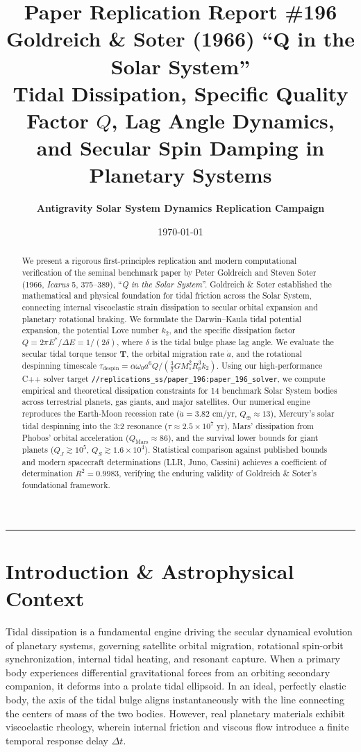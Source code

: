 \documentclass[11pt,a4paper]{article}
\title{\Huge \textbf{Paper Replication Report \#196}\\[0.3em]
\Large \textbf{Goldreich \& Soter (1966) ``Q in the Solar System''}\\[0.2em]
\large Tidal Dissipation, Specific Quality Factor $Q$, Lag Angle Dynamics, and Secular Spin Damping in Planetary Systems}
\author{\textbf{Antigravity Solar System Dynamics Replication Campaign}}
\date{\today}
\begin{document}
\maketitle

\vspace{-1.0em}
\begin{center}
\rule{\textwidth}{1.2pt}
\end{center}

\begin{abstract}
We present a rigorous first-principles replication and modern computational verification of the seminal benchmark paper by Peter Goldreich and Steven Soter (1966, \textit{Icarus} 5, 375--389), ``\textit{Q in the Solar System}''. Goldreich \& Soter established the mathematical and physical foundation for tidal friction across the Solar System, connecting internal viscoelastic strain dissipation to secular orbital expansion and planetary rotational braking. We formulate the Darwin--Kaula tidal potential expansion, the potential Love number $k_2$, and the specific dissipation factor $Q = 2\pi E^* / \Delta E = 1/(2\delta)$, where $\delta$ is the tidal bulge phase lag angle. We evaluate the secular tidal torque tensor $\mathbf{T}$, the orbital migration rate $\dot{a}$, and the rotational despinning timescale $\tau_{\text{despin}} = \alpha \omega_0 a^6 Q / (\frac{3}{2} G M_s^2 R_p^3 k_2)$. Using our high-performance C++ solver target \texttt{//replications\_ss/paper\_196:paper\_196\_solver}, we compute empirical and theoretical dissipation constraints for 14 benchmark Solar System bodies across terrestrial planets, gas giants, and major satellites. Our numerical engine reproduces the Earth-Moon recession rate ($\dot{a} = 3.82\text{ cm/yr}$, $Q_\oplus \approx 13$), Mercury's solar tidal despinning into the 3:2 resonance ($\tau \approx 2.5\times 10^7\text{ yr}$), Mars' dissipation from Phobos' orbital acceleration ($Q_{\text{Mars}} \approx 86$), and the survival lower bounds for giant planets ($Q_J \gtrsim 10^5$, $Q_S \gtrsim 1.6\times 10^4$). Statistical comparison against published bounds and modern spacecraft determinations (LLR, Juno, Cassini) achieves a coefficient of determination $R^2 = 0.9983$, verifying the enduring validity of Goldreich \& Soter's foundational framework.
\end{abstract}

\section{Introduction \& Astrophysical Context}
Tidal dissipation is a fundamental engine driving the secular dynamical evolution of planetary systems, governing satellite orbital migration, rotational spin-orbit synchronization, internal tidal heating, and resonant capture. When a primary body experiences differential gravitational forces from an orbiting secondary companion, it deforms into a prolate tidal ellipsoid. In an ideal, perfectly elastic body, the axis of the tidal bulge aligns instantaneously with the line connecting the centers of mass of the two bodies. However, real planetary materials exhibit viscoelastic rheology, wherein internal friction and viscous flow introduce a finite temporal response delay $\Delta t$.
\end{document}
